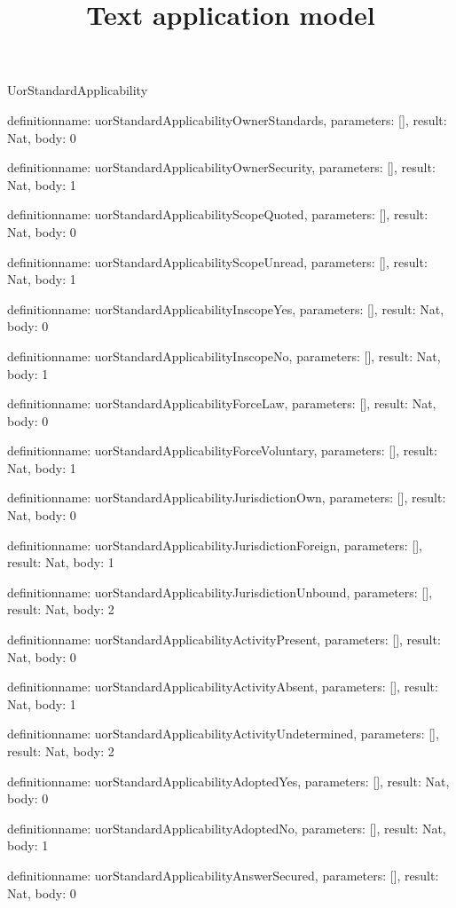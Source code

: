 \begin{lexlean}{UorStandardApplicability}
\title{Text application model}
\begin{semanticmodule}
definition{name: uorStandardApplicabilityOwnerStandards, parameters: [], result: Nat, body: 0}

definition{name: uorStandardApplicabilityOwnerSecurity, parameters: [], result: Nat, body: 1}

definition{name: uorStandardApplicabilityScopeQuoted, parameters: [], result: Nat, body: 0}

definition{name: uorStandardApplicabilityScopeUnread, parameters: [], result: Nat, body: 1}

definition{name: uorStandardApplicabilityInscopeYes, parameters: [], result: Nat, body: 0}

definition{name: uorStandardApplicabilityInscopeNo, parameters: [], result: Nat, body: 1}

definition{name: uorStandardApplicabilityForceLaw, parameters: [], result: Nat, body: 0}

definition{name: uorStandardApplicabilityForceVoluntary, parameters: [], result: Nat, body: 1}

definition{name: uorStandardApplicabilityJurisdictionOwn, parameters: [], result: Nat, body: 0}

definition{name: uorStandardApplicabilityJurisdictionForeign, parameters: [], result: Nat, body: 1}

definition{name: uorStandardApplicabilityJurisdictionUnbound, parameters: [], result: Nat, body: 2}

definition{name: uorStandardApplicabilityActivityPresent, parameters: [], result: Nat, body: 0}

definition{name: uorStandardApplicabilityActivityAbsent, parameters: [], result: Nat, body: 1}

definition{name: uorStandardApplicabilityActivityUndetermined, parameters: [], result: Nat, body: 2}

definition{name: uorStandardApplicabilityAdoptedYes, parameters: [], result: Nat, body: 0}

definition{name: uorStandardApplicabilityAdoptedNo, parameters: [], result: Nat, body: 1}

definition{name: uorStandardApplicabilityAnswerSecured, parameters: [], result: Nat, body: 0}


\end{semanticmodule}
\end{lexlean}
